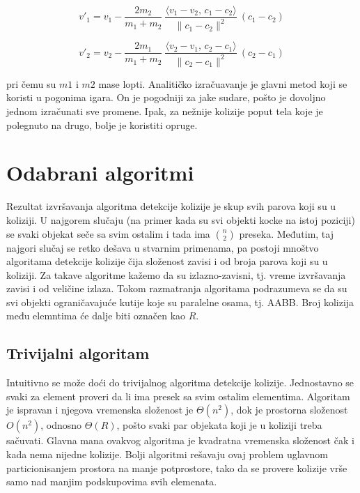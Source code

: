 \documentclass[12pt,oneside]{memoir}
\begin{document}
$$  {v}'_1= {v}_1-\frac{2 m_2}{m_1+m_2} \ \frac{\langle  {v}_1- {v}_2,\, {c}_1- {c}_2\rangle}{\| {c}_1- {c}_2\|^2} \ ( {c}_1- {c}_2) $$

$$  {v}'_2= {v}_2-\frac{2 m_1}{m_1+m_2} \ \frac{\langle  {v}_2- {v}_1,\, {c}_2- {c}_1\rangle}{\| {c}_2- {c}_1\|^2} \ ( {c}_2- {c}_1) $$

pri čemu su $m1$ i $m2$ mase lopti.
Analitičko izračuavanje je glavni metod koji se koristi u pogonima igara.
On je pogodniji za jake sudare, pošto je dovoljno jednom izračunati sve promene.
Ipak, za nežnije kolizije poput tela koje je polegnuto na drugo, bolje je koristiti opruge.

\chapter{Odabrani algoritmi}
\label{sec:algoritmi}

Rezultat izvršavanja algoritma detekcije kolizije je skup svih parova koji su u koliziji.
U najgorem slučaju (na primer kada su svi objekti kocke na istoj poziciji) se svaki objekat
seče sa svim ostalim i tada ima $ {n\choose 2}  $ preseka. Međutim, taj najgori slučaj se retko dešava
u stvarnim primenama, pa postoji mnoštvo algoritama detekcije kolizije čija složenost zavisi i od broja
parova koji su u koliziji. Za takave algoritme kažemo da su izlazno-zavisni, tj.
vreme izvršavanja zavisi i od veličine izlaza. Tokom razmatranja algoritama podrazumeva se da su svi
objekti ograničavajuće kutije koje su paralelne osama, tj. AABB.
Broj kolizija među elemntima će dalje biti označen kao $R$. 

\section{Trivijalni algoritam}
\label{subsec:triv}

Intuitivno se može doći do trivijalnog algoritma detekcije kolizije. 
Jednostavno se svaki za element proveri da li ima presek sa svim ostalim elementima.
Algoritam je ispravan i njegova vremenska složenost je $\Theta (n^2) $, dok je prostorna složenost
$O(n^2)$, odnosno $\Theta(R)$, pošto svaki par objekata koji je u koliziji treba sačuvati.
Glavna mana ovakvog algoritma je kvadratna vremenska složenost čak i kada nema nijedne kolizije.
Bolji algoritmi rešavaju ovaj problem uglavnom particionisanjem prostora na manje potprostore, tako da
se provere kolizije vrše samo nad manjim podskupovima svih elemenata.
\end{document}
